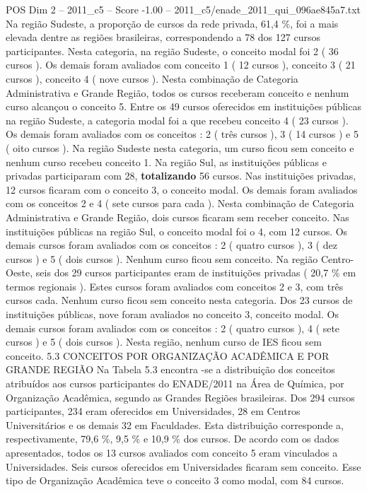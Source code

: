 \begin{textsample}{POS Dim 2 – 2011\_c5 – Score -1.00 – 2011\_c5/enade\_2011\_qui\_096ae845a7.txt}
Na região Sudeste, a proporção de cursos da rede privada, 61,4 \%, foi a mais elevada dentre as regiões brasileiras, correspondendo a 78 dos 127 cursos participantes.
Nesta categoria, na região Sudeste, o conceito modal foi 2 ( 36 cursos ).
Os demais foram avaliados com conceito 1 ( 12 cursos ), conceito 3 ( 21 cursos ), conceito 4 ( nove cursos ).
Nesta combinação de Categoria Administrativa e Grande Região, todos os cursos receberam conceito e nenhum curso alcançou o conceito 5.
Entre os 49 cursos oferecidos em instituições públicas na região Sudeste, a categoria modal foi a que recebeu conceito 4 ( 23 cursos ).
Os demais foram avaliados com os conceitos : 2 ( três cursos ), 3 ( 14 cursos ) e 5 ( oito cursos ).
Na região Sudeste nesta categoria, um curso ficou sem conceito e nenhum curso recebeu conceito 1.
Na região Sul, as instituições públicas e privadas participaram com 28, \textbf{totalizando} 56 cursos.
Nas instituições privadas, 12 cursos ficaram com o conceito 3, o conceito modal.
Os demais foram avaliados com os conceitos 2 e 4 ( sete cursos para cada ).
Nesta combinação de Categoria Administrativa e Grande Região, dois cursos ficaram sem receber conceito.
Nas instituições públicas na região Sul, o conceito modal foi o 4, com 12 cursos.
Os demais cursos foram avaliados com os conceitos : 2 ( quatro cursos ), 3 ( dez cursos ) e 5 ( dois cursos ).
Nenhum curso ficou sem conceito.
Na região Centro-Oeste, seis dos 29 cursos participantes eram de instituições privadas ( 20,7 \% em termos regionais ).
Estes cursos foram avaliados com conceitos 2 e 3, com três cursos cada.
Nenhum curso ficou sem conceito nesta categoria.
Dos 23 cursos de instituições públicas, nove foram avaliados no conceito 3, conceito modal.
Os demais cursos foram avaliados com os conceitos : 2 ( quatro cursos ), 4 ( sete cursos ) e 5 ( dois cursos ).
Nesta região, nenhum curso de IES ficou sem conceito. 5.3 CONCEITOS POR ORGANIZAÇÃO ACADÊMICA E POR GRANDE REGIÃO Na Tabela 5.3 encontra -se a distribuição dos conceitos atribuídos aos cursos participantes do ENADE/2011 na Área de Química, por Organização Acadêmica, segundo as Grandes Regiões brasileiras.
Dos 294 cursos participantes, 234 eram oferecidos em Universidades, 28 em Centros Universitários e os demais 32 em Faculdades.
Esta distribuição corresponde a, respectivamente, 79,6 \%, 9,5 \% e 10,9 \% dos cursos.
De acordo com os dados apresentados, todos os 13 cursos avaliados com conceito 5 eram vinculados a Universidades.
Seis cursos oferecidos em Universidades ficaram sem conceito.
Esse tipo de Organização Acadêmica teve o conceito 3 como modal, com 84 cursos.

\end{textsample}
